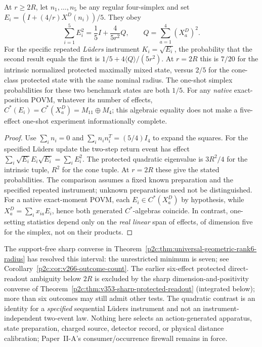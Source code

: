 \documentclass[12pt,a4paper]{article}
\begin{document}
\begin{proposition}
\label{p2c:prop:v266-repeat-fingerprint}
At $r\ge2R$, let $n_1,\ldots,n_5$ be any regular four-simplex and set
$E_i=(I+(4/r)X^D(n_i))/5$. They obey
\[
\boxed{\sum_{i=1}^5E_i^2=\frac15I+\frac4{5r^2}Q,\qquad
Q=\sum_{a=1}^4(X_a^D)^2.}
\]
For the specific repeated \emph{L\"uders} instrument
$K_i=\sqrt{E_i}$, the probability that the second result equals the
first is $1/5+4\langle Q\rangle/(5r^2)$. At $r=2R$ this is $7/20$
for the intrinsic normalized protected maximally mixed state, versus
$2/5$ for the cone-class protected state with the same nominal radius.
The one-shot simplex probabilities for these two benchmark states are
both $1/5$. For any \emph{native} exact-position POVM, whatever its
number of effects, $C^*(E_i)=C^*(X_a^D)=M_{11}\oplus M_4$; this
algebraic equality does not make a five-effect one-shot experiment
informationally complete.
\end{proposition}
\begin{proof}
Use $\sum_in_i=0$ and $\sum_in_in_i^T=(5/4)I_4$ to expand the squares.
For the specified L\"uders update the two-step return event has effect
$\sum_i\sqrt{E_i}E_i\sqrt{E_i}=\sum_iE_i^2$.
The protected quadratic eigenvalue is $3R^2/4$ for the intrinsic tuple,
$R^2$ for the cone tuple. At $r=2R$ these give the stated probabilities.
The comparison assumes a fixed known preparation and the specified
repeated instrument; unknown preparations need not be distinguished.
For a native exact-moment POVM, each $E_i\in C^*(X_a^D)$ by hypothesis,
while $X_a^D=\sum_ix_{ia}E_i$, hence both generated $C^*$-algebras coincide.
In contrast, one-setting statistics depend only on the \emph{real linear}
span of effects, of dimension five for the simplex, not on their products.
\end{proof}

\begin{remark}
\label{p2c:rem:v266-readout-firewall}
The support-free sharp converse in
Theorem~\ref{p2c:thm:universal-geometric-rank6-radius}
has resolved this interval: the unrestricted minimum is seven;
see Corollary~\ref{p2c:cor:v266-outcome-count}. The earlier
six-effect protected direct-readout ambiguity below $2R$ is excluded
by the sharp dimension-and-positivity converse of
Theorem~\ref{p2c:thm:v353-sharp-protected-readout} (integrated below);
more than six outcomes may still admit other tests.
The quadratic contrast is an identity for a \emph{specified} sequential
L\"uders instrument and not an instrument-independent two-event law.
Nothing here selects an action-generated apparatus, state preparation,
charged source, detector record, or physical distance calibration;
Paper~II-A's consumer/occurrence firewall remains in force.
\end{remark}
\end{document}
